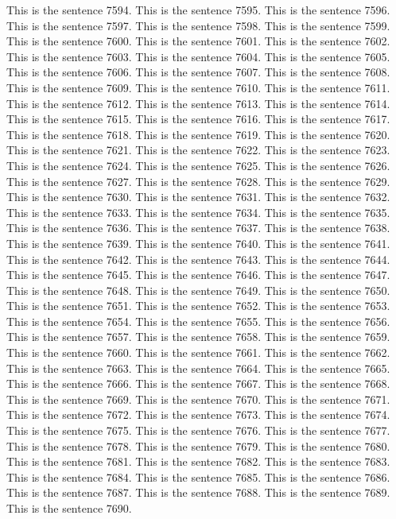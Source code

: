 \documentclass{article}
\begin{document}
This is the sentence 7594.
This is the sentence 7595.
This is the sentence 7596.
This is the sentence 7597.
This is the sentence 7598.
This is the sentence 7599.
This is the sentence 7600.
This is the sentence 7601.
This is the sentence 7602.
This is the sentence 7603.
This is the sentence 7604.
This is the sentence 7605.
This is the sentence 7606.
This is the sentence 7607.
This is the sentence 7608.
This is the sentence 7609.
This is the sentence 7610.
This is the sentence 7611.
This is the sentence 7612.
This is the sentence 7613.
This is the sentence 7614.
This is the sentence 7615.
This is the sentence 7616.
This is the sentence 7617.
This is the sentence 7618.
This is the sentence 7619.
This is the sentence 7620.
This is the sentence 7621.
This is the sentence 7622.
This is the sentence 7623.
This is the sentence 7624.
This is the sentence 7625.
This is the sentence 7626.
This is the sentence 7627.
This is the sentence 7628.
This is the sentence 7629.
This is the sentence 7630.
This is the sentence 7631.
This is the sentence 7632.
This is the sentence 7633.
This is the sentence 7634.
This is the sentence 7635.
This is the sentence 7636.
This is the sentence 7637.
This is the sentence 7638.
This is the sentence 7639.
This is the sentence 7640.
This is the sentence 7641.
This is the sentence 7642.
This is the sentence 7643.
This is the sentence 7644.
This is the sentence 7645.
This is the sentence 7646.
This is the sentence 7647.
This is the sentence 7648.
This is the sentence 7649.
This is the sentence 7650.
This is the sentence 7651.
This is the sentence 7652.
This is the sentence 7653.
This is the sentence 7654.
This is the sentence 7655.
This is the sentence 7656.
This is the sentence 7657.
This is the sentence 7658.
This is the sentence 7659.
This is the sentence 7660.
This is the sentence 7661.
This is the sentence 7662.
This is the sentence 7663.
This is the sentence 7664.
This is the sentence 7665.
This is the sentence 7666.
This is the sentence 7667.
This is the sentence 7668.
This is the sentence 7669.
This is the sentence 7670.
This is the sentence 7671.
This is the sentence 7672.
This is the sentence 7673.
This is the sentence 7674.
This is the sentence 7675.
This is the sentence 7676.
This is the sentence 7677.
This is the sentence 7678.
This is the sentence 7679.
This is the sentence 7680.
This is the sentence 7681.
This is the sentence 7682.
This is the sentence 7683.
This is the sentence 7684.
This is the sentence 7685.
This is the sentence 7686.
This is the sentence 7687.
This is the sentence 7688.
This is the sentence 7689.
This is the sentence 7690.
\end{document}
